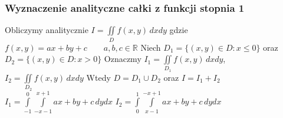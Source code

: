 \documentclass[9pt]{beamer}
\newcommand{\n}{\newline}
\begin{document}
	\begin{frame}
		\frametitle{Wyznaczenie analityczne całki z funkcji stopnia 1}

        \begin{spacing}{2}
        Obliczymy analitycznie $ I = \iint\limits_D f(x,y) \, dx dy $ gdzie
        $ f(x,y) = ax + by + c \qquad a,b,c \in \mathbb{R}$ \n
        Niech $ D_1 = \{(x,y) \in D : x \leq 0\} $ oraz $ D_2 = \{(x,y) \in D : x > 0\} $ \n
        Oznaczmy $ I_1 = \iint\limits_{D_1} f(x,y) \, dx dy $, $ I_2 = \iint\limits_{D_2} f(x,y) \, dx dy $ \n
        Wtedy $ D = D_1 \cup D_2 $ oraz $ I = I_1 + I_2 $ \n
        $ I_1 = \int\limits_{-1}^{0}\int\limits_{-x-1}^{x+1} ax+by+c \, dy dx $ \qquad\n
        $ I_2 = \int\limits_{0}^{1}\int\limits_{x-1}^{-x+1} ax+by+c \, dy dx $ \n
        \end{spacing}

	\end{frame}
\end{document}
